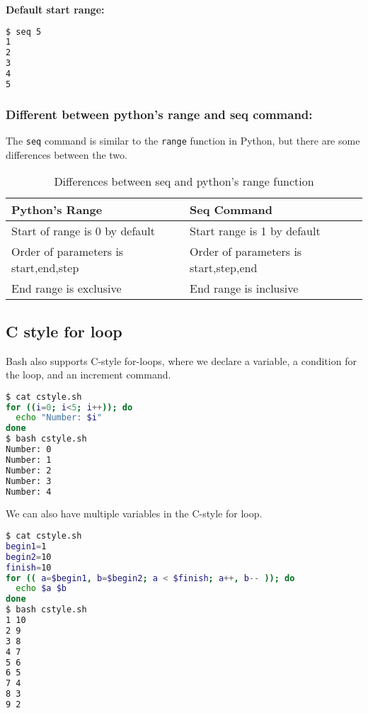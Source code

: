 \textbf{Default start range:}

\begin{lstlisting}[language=bash]
$ seq 5
1
2
3
4
5
\end{lstlisting}

\subsubsection{Different between python's range and seq command:}

The \lstinline|seq| command is similar to the \lstinline|range| function in Python, but there are some differences between the two.

\begin{table*}[h!]
  \caption{Differences between seq and python's range function}
  \begin{tabular}{l l}
    \toprule
    \textbf{Python's Range} & \textbf{Seq Command} \\
    \midrule
    Start of range is 0 by default & Start range is 1 by default \\
    Order of parameters is start,end,step & Order of parameters is start,step,end \\
    End range is exclusive & End range is inclusive \\
    \bottomrule
  \end{tabular}
\end{table*}

\subsection{C style for loop}

Bash also supports C-style for-loops, where we declare a variable, a condition for the loop, and an increment command.

\begin{lstlisting}[language=bash]
$ cat cstyle.sh
for ((i=0; i<5; i++)); do
  echo "Number: $i"
done
$ bash cstyle.sh
Number: 0
Number: 1
Number: 2
Number: 3
Number: 4
\end{lstlisting}

We can also have multiple variables in the C-style for loop.

\begin{lstlisting}[language=bash]
$ cat cstyle.sh
begin1=1
begin2=10
finish=10
for (( a=$begin1, b=$begin2; a < $finish; a++, b-- )); do
  echo $a $b
done
$ bash cstyle.sh
1 10
2 9
3 8
4 7
5 6
6 5
7 4
8 3
9 2
\end{lstlisting}

